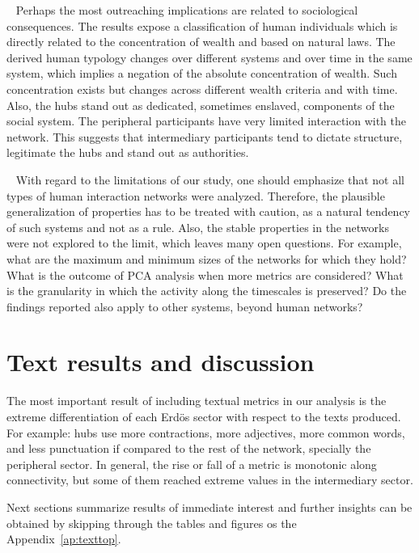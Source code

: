  
Perhaps the most outreaching implications are related to sociological consequences. The results expose a classification of human individuals which is directly related to the concentration of wealth and based on natural laws. The derived human typology changes over different systems and over time in the same system, which implies a negation of the absolute concentration of wealth. Such concentration exists but changes across different wealth criteria and with time. Also, the hubs stand out as dedicated, sometimes enslaved,
components of the social system. The peripheral participants have very limited interaction with the network. This suggests that intermediary participants tend to dictate structure, legitimate the hubs and stand out as authorities.

 
With regard to the limitations of our study, one should emphasize that not all types of human interaction networks were analyzed. Therefore, the plausible generalization of properties has to be treated with caution, as a natural tendency of such systems and not as a rule. Also, the stable properties in the networks were not explored to the limit, which leaves many open questions. For example, what are the maximum and minimum sizes of the networks for which they hold? What is the outcome of PCA analysis when more metrics are considered? What is the granularity in which the activity along the timescales is preserved? Do the findings reported also apply to other systems, beyond human networks?
 
\section{Text results and discussion}\label{sec:tresults}

The most important result of including textual metrics in our analysis is the
extreme differentiation of each Erd\"os sector with respect to the texts produced.
For example: hubs use more contractions, more adjectives,
more common words, and less punctuation if compared to the rest of the network,
specially the peripheral sector.
In general, the rise or fall of a metric is monotonic along connectivity,
but some of them reached extreme values in the intermediary sector.

Next sections summarize results of immediate interest
and further insights can be obtained by skipping through
the tables and figures os the Appendix~\ref{ap:texttop}.

